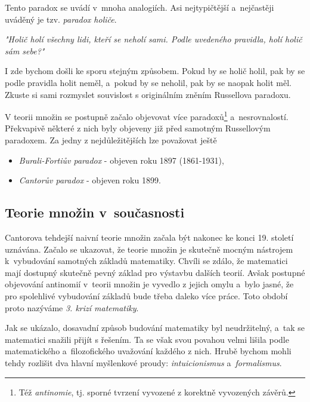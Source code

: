 Tento paradox se uvádí v~mnoha analogiích. Asi nejtypičtější a~nejčastěji uváděný je tzv. \emph{paradox holiče}.

\textit{"Holič holí všechny lidi, kteří se neholí sami. Podle uvedeného pravidla, holí holič sám sebe?"}

I zde bychom došli ke sporu stejným způsobem. Pokud by se holič holil, pak by se podle pravidla holit neměl, a~pokud by se neholil, pak by se naopak holit měl. Zkuste si sami rozmyslet souvislost s originálním zněním Russellova paradoxu.\par
V teorii množin se postupně začalo objevovat více paradoxů\footnote{Též \emph{antinomie}, tj. sporné tvrzení vyvozené z korektně vyvozených závěrů.} a~nesrovnalostí. Překvapivě některé z nich byly objeveny již před samotným Russellovým paradoxem. Za jedny z nejdůležitějších lze považovat ještě
\begin{itemize}
\item \emph{Burali-Fortiův paradox} - objeven roku 1897  \mbox{(1861-1931)},
\item \emph{Cantorův paradox} - objeven roku 1899.
\end{itemize}
\subsection{Teorie množin v~současnosti}
\label{subsec:tm_soucasnost}
Cantorova tehdejší naivní teorie množin začala být nakonec ke konci 19. století uznávána. Začalo se ukazovat, že teorie množin je skutečně mocným nástrojem k~vybudování samotných základů matematiky. Chvíli se zdálo, že matematici mají dostupný skutečně pevný základ pro výstavbu dalších teorií. Avšak postupné objevování antinomií v~teorii množin je vyvedlo z jejich omylu a~bylo jasné, že pro spolehlivé vybudování základů bude třeba daleko více práce. Toto období proto nazýváme \emph{3. krizí matematiky}.\par
Jak se ukázalo, dosavadní způsob budování matematiky byl neudržitelný, a~tak se matematici snažili přijít s řešením. Ta se však svou povahou velmi lišila podle matematického a~filozofického uvažování každého z nich. Hrubě bychom mohli tehdy rozlišit dva hlavní myšlenkové proudy: \emph{intuicionismus} a~\emph{formalismus}.

